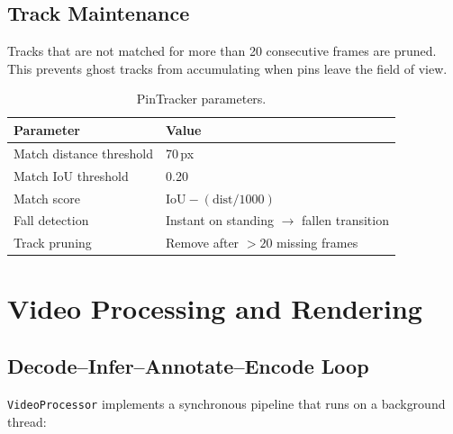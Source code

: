 \documentclass{zc-ust-hw}
\begin{document}
\subsection{Track Maintenance}

Tracks that are not matched for more than 20 consecutive frames are pruned.
This prevents ghost tracks from accumulating when pins leave the field of view.

\begin{table}[H]
\centering
\begin{tabular}{ll}
\toprule
\textbf{Parameter} & \textbf{Value} \\
\midrule
Match distance threshold & 70\,px \\
Match IoU threshold      & 0.20 \\
Match score              & $\text{IoU} - (\text{dist} / 1000)$ \\
Fall detection            & Instant on standing $\rightarrow$ fallen transition \\
Track pruning             & Remove after $>20$ missing frames \\
\bottomrule
\end{tabular}
\caption{PinTracker parameters.}
\end{table}

\section{Video Processing and Rendering}

\subsection{Decode--Infer--Annotate--Encode Loop}

\texttt{VideoProcessor} implements a synchronous pipeline that runs on a background thread:
\end{document}
